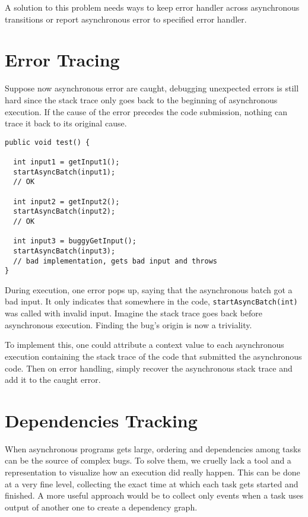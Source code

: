 A solution to this problem needs ways to keep error handler across asynchronous transitions or report asynchronous error to specified error handler.

\section{Error Tracing}

Suppose now asynchronous error are caught, debugging unexpected errors is still hard since the stack trace only goes back to the beginning of asynchronous execution. If the cause of the error precedes the code submission, nothing can trace it back to its original cause.

\begin{lstlisting}
public void test() {

  int input1 = getInput1();
  startAsyncBatch(input1);
  // OK

  int input2 = getInput2();
  startAsyncBatch(input2);
  // OK

  int input3 = buggyGetInput();
  startAsyncBatch(input3);
  // bad implementation, gets bad input and throws
}
\end{lstlisting}

During execution, one error pops up, saying that the asynchronous batch got a bad input. It only indicates that somewhere in the code, \lstinline{startAsyncBatch(int)} was called with invalid input. Imagine the stack trace goes back before asynchronous execution. Finding the bug's origin is now a triviality.

To implement this, one could attribute a context value to each asynchronous execution containing the stack trace of the code that submitted the asynchronous code. Then on error handling, simply recover the asynchronous stack trace and add it to the caught error.

\section{Dependencies Tracking}

When asynchronous programs gets large, ordering and dependencies among tasks can be the source of complex bugs. To solve them, we cruelly lack a tool and a representation to visualize how an execution did really happen. This can be done at a very fine level, collecting the exact time at which each task gets started and finished. A more useful approach would be to collect only events when a task uses output of another one to create a dependency graph.

